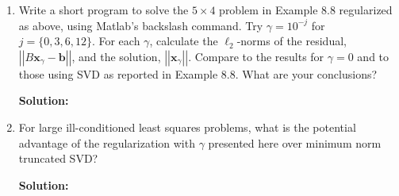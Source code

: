\documentclass[12pt]{article}
\newcommand{\norm}[1]{\left|\left| #1 \right|\right|}
\begin{document}
\begin{enumerate}
\begin{enumerate}
  \item Write a short program to solve the $5 \times 4$ problem in Example 8.8 regularized
  as above, using {\sc Matlab}'s backslash command. Try $\gamma = 10^{-j}$ for
  $j = \{ 0, 3, 6, 12\}$. For each $\gamma$, calculate the $\ell_{2}$-norms of the
  residual, $\norm{B\mathbf{x}_{\gamma} - \mathbf{b}}$, and the solution, $\norm{\mathbf{x}_{\gamma}}$.
  Compare to the results for $\gamma = 0$ and to those using SVD as reported in
  Example 8.8. What are your conclusions?

  {\bf Solution:}

  \item For large ill-conditioned least squares problems, what is the potential advantage
  of the regularization with $\gamma$ presented here over minimum norm truncated SVD?

  {\bf Solution:}

\end{enumerate}
\end{enumerate}

\end{document}
